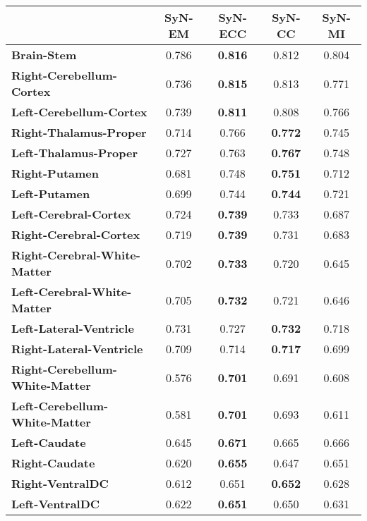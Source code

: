 \begin{table}[htbp]
  {\small
  \centering
    \begin{tabular}{lcccc}
    \toprule
    \textbf{}& \textbf{SyN-EM} & \textbf{SyN-ECC} & \textbf{SyN-CC} & \textbf{SyN-MI} \\
    \midrule
    \textbf{Brain-Stem} & 0.786 & \textbf{0.816} & 0.812 & 0.804 \\
    \textbf{Right-Cerebellum-Cortex} & 0.736 & \textbf{0.815} & 0.813 & 0.771 \\
    \textbf{Left-Cerebellum-Cortex} & 0.739 & \textbf{0.811} & 0.808 & 0.766 \\
    \textbf{Right-Thalamus-Proper} & 0.714 & 0.766 & \textbf{0.772} & 0.745 \\
    \textbf{Left-Thalamus-Proper} & 0.727 & 0.763 & \textbf{0.767} & 0.748 \\
    \textbf{Right-Putamen} & 0.681 & 0.748 & \textbf{0.751} & 0.712 \\
    \textbf{Left-Putamen} & 0.699 & 0.744 & \textbf{0.744} & 0.721 \\
    \textbf{Left-Cerebral-Cortex} & 0.724 & \textbf{0.739} & 0.733 & 0.687 \\
    \textbf{Right-Cerebral-Cortex} & 0.719 & \textbf{0.739} & 0.731 & 0.683 \\
    \textbf{Right-Cerebral-White-Matter} & 0.702 & \textbf{0.733} & 0.720 & 0.645 \\
    \textbf{Left-Cerebral-White-Matter} & 0.705 & \textbf{0.732} & 0.721 & 0.646 \\
    \textbf{Left-Lateral-Ventricle} & 0.731 & 0.727 & \textbf{0.732} & 0.718 \\
    \textbf{Right-Lateral-Ventricle} & 0.709 & 0.714 & \textbf{0.717} & 0.699 \\
    \textbf{Right-Cerebellum-White-Matter} & 0.576 & \textbf{0.701} & 0.691 & 0.608 \\
    \textbf{Left-Cerebellum-White-Matter} & 0.581 & \textbf{0.701} & 0.693 & 0.611 \\
    \textbf{Left-Caudate} & 0.645 & \textbf{0.671} & 0.665 & 0.666 \\
    \textbf{Right-Caudate} & 0.620 & \textbf{0.655} & 0.647 & 0.651 \\
    \textbf{Right-VentralDC} & 0.612 & 0.651 & \textbf{0.652} & 0.628 \\
    \textbf{Left-VentralDC} & 0.622 & \textbf{0.651} & 0.650 & 0.631 \\

\end{tabular}}
\end{table}
